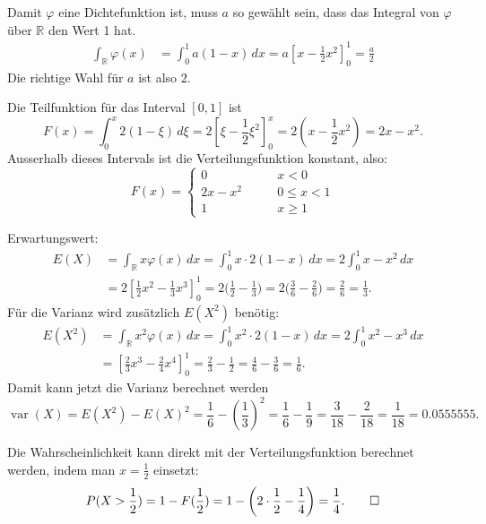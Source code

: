 \begin{loesung}
\begin{teilaufgaben}
\item
Damit $\varphi$ eine Dichtefunktion ist, muss $a$ so gewählt sein,
dass das Integral von $\varphi$ über $\mathbb R$ den Wert 1 hat.
\begin{align*}
\int_{\mathbb R}\varphi(x)
&=
\int_{0}^{1}a(1-x)\,dx=a\left[x-\frac12x^2\right]_0^1
=
\frac{a}2
\end{align*}
Die richtige Wahl für $a$ ist also $2$.
\item
Die Teilfunktion für das Interval $[0,1]$ ist
\[
F(x)=\int_{0}^x 2(1-\xi)\,d\xi
=
2\left[\xi - \frac12\xi^2\right]_0^x
=
2(x-\frac12x^2)
=
2x-x^2.
\]
Ausserhalb dieses Intervals ist die Verteilungsfunktion konstant, also:
\[
F(x)=\begin{cases}
0&\qquad x < 0\\
2x-x^2
&\qquad 0 \le x < 1\\
1&\qquad x\ge1
\end{cases}
\]
\item
Erwartungswert:
\begin{align*}
E(X)&=\int_{\mathbb R} x\varphi(x)\,dx
=
\int_0^1x\cdot 2(1-x)\,dx
=
2\int_0^1 x-x^2\,dx
\\
&=
2\left[\frac12x^2-\frac13x^3\right]_0^1
=2\biggl(\frac12-\frac13\biggr)
=2\biggl(\frac3{6}-\frac{2}{6}\biggr)
=\frac2{6}=\frac13.
\end{align*}
Für die Varianz wird zusätzlich $E(X^2)$ benötig:
\begin{align*}
E(X^2)
&=
\int_{\mathbb R} x^2\varphi(x)\,dx
=
\int_0^1x^2\cdot 2(1-x)\,dx
=
2\int_0^1 x^2-x^3\,dx
\\
&=\left[\frac23x^3-\frac24x^4\right]_0^1
=\frac23-\frac12=\frac4{6}-\frac{3}{6}=\frac{1}{6}.
\end{align*}
Damit kann jetzt die Varianz berechnet werden
\[
\operatorname{var}(X)=E(X^2)-E(X)^2=\frac{1}{6}-\left(\frac{1}{3}\right)^2
=\frac16-\frac19=\frac3{18}-\frac2{18}
=\frac{1}{18}=0.0555555.
\]
\item
Die Wahrscheinlichkeit kann direkt mit der Verteilungsfunktion
berechnet werden, indem man $x=\frac12$ einsetzt:
\[
P(X>\frac12)
=
1-F(\frac12)=1-\biggl(2\cdot \frac12-\frac14\biggr)=\frac14.
\qedhere
\]
\end{teilaufgaben}
\end{loesung}

